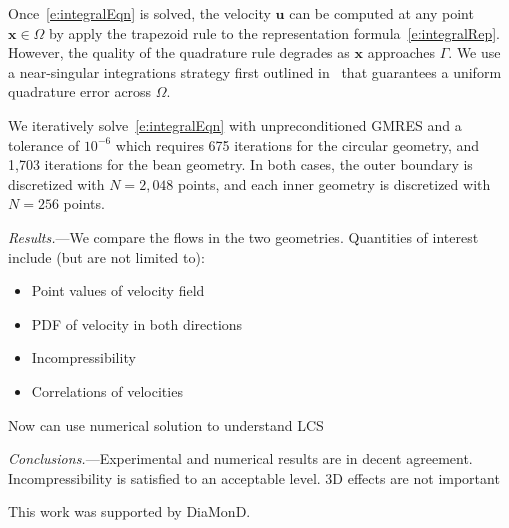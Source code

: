 \documentclass[twocolumn,showpacs,pre,preprintnumbers,floatfix]{revtex4-1}
\newcommand{\uu}{{\mathbf{u}}}
\newcommand{\xx}{{\mathbf{x}}}
\begin{document}
Once~\eqref{e:integralEqn} is solved, the velocity $\uu$ can be computed
at any point $\xx \in \Omega$ by apply the trapezoid rule to the
representation formula~\eqref{e:integralRep}.  However, the quality of
the quadrature rule degrades as $\xx$ approaches $\Gamma$.  We use a
near-singular integrations strategy first outlined
in~\cite{bir:yin:zor2004} that guarantees a uniform quadrature error
across $\Omega$.

We iteratively solve~\eqref{e:integralEqn} with unpreconditioned GMRES
and a tolerance of $10^{-6}$ which requires 675 iterations for the
circular geometry, and 1,703 iterations for the bean geometry.  In both
cases, the outer boundary is discretized with $N = 2,048$ points, and
each inner geometry is discretized with $N = 256$ points.



{\em Results.}---We compare the flows in the two geometries.
Quantities of interest include (but are not limited to):
\begin{itemize}
  \item Point values of velocity field
  \item PDF of velocity in both directions
  \item Incompressibility
  \item Correlations of velocities
\end{itemize}

Now can use numerical solution to understand LCS


{\em Conclusions.}---Experimental and numerical results are in decent
agreement.  Incompressibility is satisfied to an acceptable level.  3D
effects are not important




This work was supported by DiaMonD.



\end{document}

